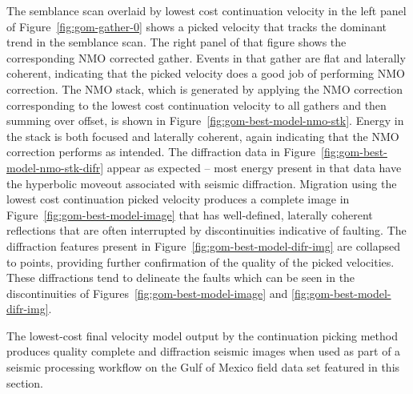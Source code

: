 The semblance scan overlaid by lowest cost continuation velocity in the left panel of Figure~\ref{fig:gom-gather-0} shows a picked velocity that tracks the dominant trend in the semblance scan.  The right panel of that figure shows the corresponding NMO corrected gather.  Events in that gather are flat and laterally coherent, indicating that the picked velocity does a good job of performing NMO correction.  The NMO stack, which is generated by applying the NMO correction corresponding to the lowest cost continuation velocity to all gathers and then summing over offset, is shown in Figure~\ref{fig:gom-best-model-nmo-stk}.  Energy in the stack is both focused and laterally coherent, again indicating that the NMO correction performs as intended. The diffraction data in Figure~\ref{fig:gom-best-model-nmo-stk-difr} appear as expected -- most energy present in that data have the hyperbolic moveout associated with seismic diffraction.  Migration using the lowest cost continuation picked velocity produces a complete image in Figure~\ref{fig:gom-best-model-image} that has well-defined, laterally coherent reflections that are often interrupted by discontinuities indicative of faulting.  The diffraction features present in Figure~\ref{fig:gom-best-model-difr-img} are collapsed to points, providing further confirmation of the quality of the picked velocities.  These diffractions tend to delineate the faults which can be seen in the discontinuities of Figures~\ref{fig:gom-best-model-image} and \ref{fig:gom-best-model-difr-img}. 

The lowest-cost final velocity model output by the continuation picking method produces quality complete and diffraction seismic images when used as part of a seismic processing workflow on the Gulf of Mexico field data set featured in this section.



